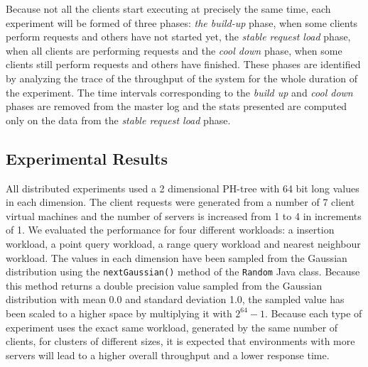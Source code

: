 \documentclass[11pt,a4paper]{globis-book}
\begin{document}
Because not all the clients start executing at precisely the same time, each experiment will be formed of three phases: \textit{the build-up} phase, when some clients perform requests and others have not started yet, the \textit{stable request load} phase, when all clients are performing requests and the \textit{cool down} phase, when some clients still perform requests and others have finished. These phases are identified by analyzing the trace of the throughput of the system for the whole duration of the experiment. The time intervals corresponding to the \textit{build up} and \textit{cool down} phases are removed from the master log and the stats presented are computed only on the data from the \textit{stable request load} phase. 

\subsection{Experimental Results}

All distributed experiments used a 2 dimensional PH-tree with 64 bit long values in each dimension. The client requests were generated from a number of 7 client virtual machines and the number of servers is increased from 1 to 4 in increments of 1. We evaluated the performance for four different workloads: a insertion workload, a point query workload, a range query workload and nearest neighbour workload. The values in each dimension have been sampled from the Gaussian distribution using the \texttt{nextGaussian()} method of the \texttt{Random} Java class. Because this method returns a double precision value sampled from the Gaussian distribution with mean 0.0 and standard deviation 1.0, the sampled value has been scaled to a higher space by multiplying it with $2^{64} - 1$. Because each type of experiment uses the exact same workload, generated by the same number of clients, for clusters of different sizes, it is expected that environments with more servers will lead to a higher overall throughput and a lower response time.
 
\end{document}
